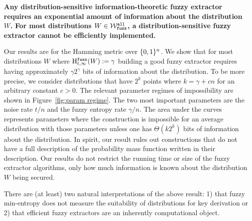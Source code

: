 \begin{displayquote}
\textbf{Any distribution-sensitive information-theoretic fuzzy extractor requires an exponential amount of information about the distribution $W$.  For most distributions $W \in \mathcal{W}_{\mathtt{fuzz}}^{\mathtt{all}}$, a distribution-sensitive fuzzy extractor cannot be efficiently implemented.} 
\end{displayquote} 
Our results are for the Hamming metric over $\{0, 1\}^n$. We show that for most distributions $W$ where $\mathrm{H}^{\mathtt{fuzz}}_{t,\infty}(W) := \gamma$ building a good fuzzy extractor requires having approximately $\gamma 2^\gamma$ bits of information about the distribution. To be more precise,  we consider distributions that have $2^k$ points where $k = \gamma + c n$ for an arbitrary constant $c>0$. 
The relevant parameter regimes of impossibility are shown in Figure~\ref{fig:param regime}.  The two most important parameters are the noise rate $t/n$ and the fuzzy entropy rate $\gamma/n$. The area under the curves represents parameters where the construction is impossible for an average distribution with those parameters unless one has $\Theta(k 2^k)$ bits of information about the distribution.  
In spirit, our result rules out constructions that do not have a full description of the probability mass function written in their description.  Our results do not restrict the running time or size of the fuzzy extractor algorithms, only how much information is known about the distribution $W$ being secured.  





There are (at least) two natural interpretations of the above result: 1) that fuzzy min-entropy does not measure the suitability of distributions for key derivation or 2) that efficient fuzzy extractors are an inherently computational object.

